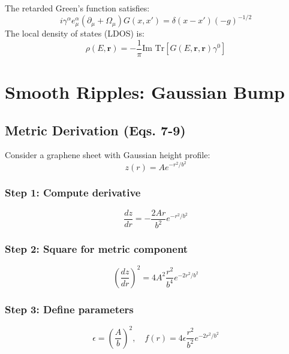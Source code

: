 \documentclass[12pt]{article}
\begin{document}
The retarded Green's function satisfies:
\begin{equation}
    i\gamma^\alpha e^\alpha_\mu (\partial_\mu + \Omega_\mu) G(x,x') = \delta(x-x')(-g)^{-1/2}
\end{equation}
The local density of states (LDOS) is:
\begin{equation}
    \rho(E, \mathbf{r}) = -\frac{1}{\pi} \text{Im Tr}[G(E, \mathbf{r}, \mathbf{r})\gamma^0]
\end{equation}

\section{Smooth Ripples: Gaussian Bump}

\subsection{Metric Derivation (Eqs. 7-9)}

Consider a graphene sheet with Gaussian height profile:
\begin{equation}
    z(r) = A e^{-r^2/b^2}
\end{equation}

\subsubsection{Step 1: Compute derivative}
\begin{equation}
    \frac{dz}{dr} = -\frac{2A r}{b^2} e^{-r^2/b^2}
\end{equation}

\subsubsection{Step 2: Square for metric component}
\begin{equation}
    \left(\frac{dz}{dr}\right)^2 = 4A^2 \frac{r^2}{b^4} e^{-2r^2/b^2}
\end{equation}

\subsubsection{Step 3: Define parameters}
\begin{equation}
    \epsilon = \left(\frac{A}{b}\right)^2, \quad f(r) = 4\epsilon \frac{r^2}{b^2} e^{-2r^2/b^2}
\end{equation}
\end{document}

